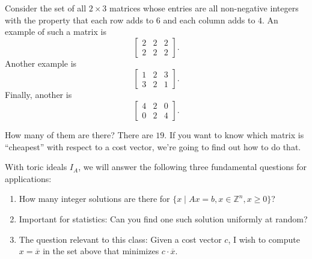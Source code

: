 \begin{example}
Consider the set of all $2 \times 3$ matrices whose entries are all non-negative integers with the property that each row adds to $6$ and each column adds to $4$. An example of such a matrix is
\[
\left[
\begin{array}{ccc}
2&2&2\\2&2&2
\end{array}
\right]
.\]
Another example is
\[
\left[
\begin{array}{ccc}
1&2&3 \\ 3 & 2&1
\end{array}
\right]
.\]
Finally, another is
\[
\left[
\begin{array}{ccc}
4&2&0\\0&2&4
\end{array}
\right]
.\]
\end{example}
How many of them are there? There are $19$. If you want to know which matrix is ``cheapest'' with respect to a cost vector, we're going to find out how to do that. 

With toric ideals $I_A$, we will answer the following three fundamental questions for applications:
\begin{enumerate}
\item How many integer solutions are there for $\{ x \mid Ax = b, x \in \mathbb{Z}^n, x \geq 0 \}$?
\item Important for statistics: Can you find one such solution uniformly at random?
\item The question relevant to this class: Given a cost vector $c$, I wish to compute $x=\overline{x}$ in the set above that minimizes $c \cdot \overline{x}$.
\end{enumerate}

